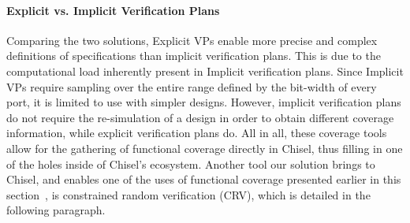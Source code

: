 \documentclass[conference]{IEEEtran}
\begin{document}
\paragraph{Explicit vs. Implicit Verification Plans}
Comparing the two solutions, Explicit VPs enable more precise and complex definitions of specifications than implicit verification plans.
This is due to the computational load inherently present in Implicit verification plans. 
Since Implicit VPs require sampling over the entire range defined by the bit-width of every port, it is limited to use with simpler designs.
However, implicit verification plans do not require the re-simulation of a design in order to obtain different coverage information, while explicit verification plans do.
All in all, these coverage tools allow for the gathering of functional coverage directly in Chisel, thus filling in one of the holes inside of Chisel's ecosystem.
Another tool our solution brings to Chisel, and enables one of the uses of functional coverage presented earlier in this section~\cite{verify:fuzzing:2021}, is constrained random verification (CRV), which is detailed in the following paragraph.


\end{document}
